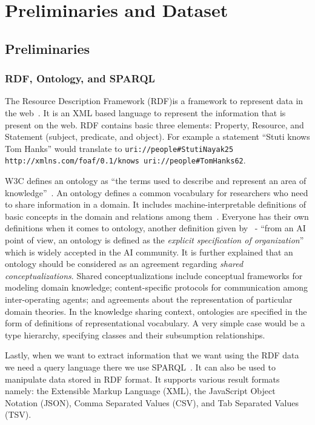 \chapter{Preliminaries and Dataset}\label{chap:method}

\section{Preliminaries}

\subsection{RDF, Ontology, and SPARQL}
The Resource Description Framework (RDF)is a framework to represent data in the web~\cite{rdf_framework}. It is an XML based language to represent the information that is present on the web. RDF contains basic three elements: Property, Resource, and Statement (subject, predicate, and object). For example a statement ``Stuti knows Tom Hanks'' would translate to \texttt{uri://people\#StutiNayak25 http://xmlns.com/foaf/0.1/knows uri://people\#TomHanks62}. 

W3C defines an ontology as “the terms used to describe and represent an area of
knowledge”~\cite{heflin2004owl}. An ontology defines a common vocabulary for researchers who need to share information in a domain. It includes machine-interpretable definitions of basic concepts in the domain and relations among them~\cite{noy2001ontology}. Everyone has their own definitions when it comes to ontology, another definition given by~\cite{gruber1993translation,gruber1995toward} - ``from an AI point of view, an ontology is defined as the \emph{explicit specification of organization}'' which is widely accepted in the AI community. It is further explained that an ontology should be considered as an agreement regarding \emph{shared conceptualizations}. Shared conceptualizations include conceptual frameworks for modeling domain knowledge; content-specific protocols for communication among inter-operating agents; and agreements about the representation of particular domain theories. In the knowledge sharing context, ontologies are specified in the form of definitions of representational vocabulary. A very simple case would be a type hierarchy, specifying classes and their subsumption relationships.

Lastly, when we want to extract information that we want using the RDF data we need a query language there we use SPARQL~\cite{harris2013sparql}. It can also be used to manipulate data stored in RDF format. It supports various result formats namely: the Extensible Markup Language (XML), the JavaScript Object Notation (JSON), Comma Separated Values (CSV), and Tab Separated Values (TSV). 




